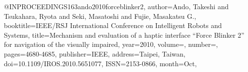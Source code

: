 @INPROCEEDINGS{163ando2010forceblinker2,
author={Ando, Takeshi and Tsukahara, Ryota and Seki, Masatoshi and Fujie, Masakatsu G.},
booktitle={IEEE/RSJ International Conference on Intelligent Robots and Systems}, 
title={Mechanism and evaluation of a haptic interface “Force Blinker 2” for navigation of the visually impaired}, 
year={2010},
volume={},
number={},
pages={4680-4685},
publisher={IEEE},
address={Taipei, Taiwan},
doi={10.1109/IROS.2010.5651077},
ISSN={2153-0866},
month={Oct},}